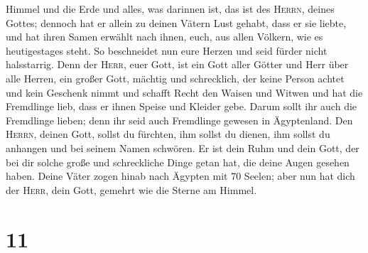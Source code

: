 Himmel und die Erde und alles, was darinnen ist, das ist des
\textsc{Herrn}, deines Gottes;  dennoch hat er allein zu
deinen Vätern Lust gehabt, dass er sie liebte, und hat ihren Samen
erwählt nach ihnen, euch, aus allen Völkern, wie es heutigestages steht.
 So beschneidet nun eure Herzen und seid fürder nicht
halsstarrig.  Denn der \textsc{Herr}, euer Gott, ist ein
Gott aller Götter und Herr über alle Herren, ein großer Gott, mächtig
und schrecklich, der keine Person achtet und kein Geschenk nimmt
 und schafft Recht den Waisen und Witwen und hat die
Fremdlinge lieb, dass er ihnen Speise und Kleider gebe. 
Darum sollt ihr auch die Fremdlinge lieben; denn ihr seid auch
Fremdlinge gewesen in Ägyptenland.  Den \textsc{Herrn},
deinen Gott, sollst du fürchten, ihm sollst du dienen, ihm sollst du
anhangen und bei seinem Namen schwören.  Er ist dein Ruhm
und dein Gott, der bei dir solche große und schreckliche Dinge getan
hat, die deine Augen gesehen haben.  Deine Väter zogen
hinab nach Ägypten mit 70 Seelen; aber nun hat dich der \textsc{Herr},
dein Gott, gemehrt wie die Sterne am Himmel.

\hypertarget{section-10}{%
\section{11}\label{section-10}}

